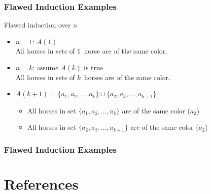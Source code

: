 \documentclass[dvipsnames]{beamer}
\begin{document}
\begin{frame}
  \frametitle{Flawed Induction Examples}

  \begin{block}{Flawed induction over $n$}
    \begin{itemize}
      \item $n=1$: $A(1)$\\
        All horses in sets of $1$~horse are of the same color.

      \pause
      \medskip
      \item $n=k$: assume $A(k)$ is true\\
        All horses in sets of $k$~horses are of the same color.
      \pause
      \medskip
      \item $A(k+1)=\{a_1,a_2,\dots,a_k\} \cup \{a_2,a_3,\dots,a_{k+1}\}$
      \begin{itemize}
        \item All horses in set $\{a_1,a_2,\dots,a_k\}$ are of the same color ($a_2$)
        \item All horses in set $\{a_2,a_3,\dots,a_{k+1}\}$ are of the same color
          ($a_2$)
      \end{itemize}
    \end{itemize}
  \end{block}
\end{frame}

\begin{frame}
  \frametitle{Flawed Induction Examples}

  \begin{center}
  \end{center}
\end{frame}

\section*{References}
\end{document}

